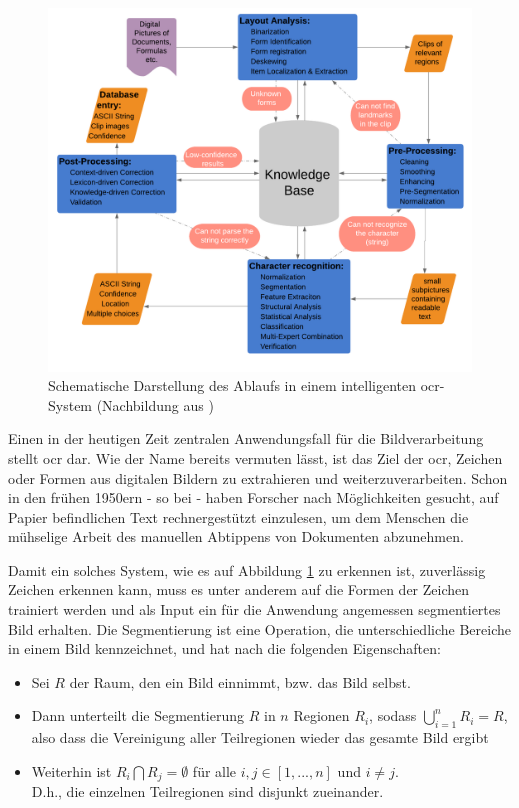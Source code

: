 	\begin{figure}[h]
		\centering
		\includegraphics[width=0.77\linewidth]{Ablauf-OCR_Cheriet-et-al.pdf}
		\caption[typisches \gls{ocr}-Ablaufschema]{Schematische Darstellung des 
			Ablaufs in einem intelligenten \gls{ocr}-System (Nachbildung aus 
			\cite[Seite 7]{cher-et-al-ocr})}
		\label{fig:ocr-system}
	\end{figure}
	
	
	Einen in der heutigen Zeit zentralen Anwendungsfall für die Bildverarbeitung stellt \gls{ocr} dar. Wie der Name bereits vermuten lässt, ist das Ziel der \gls{ocr}, Zeichen oder Formen aus digitalen Bildern zu extrahieren und weiterzuverarbeiten. Schon in den frühen 1950ern - so bei \cite{cher-et-al-ocr} - haben Forscher nach Möglichkeiten gesucht, auf Papier befindlichen Text rechnergestützt einzulesen, um dem Menschen die mühselige Arbeit des manuellen Abtippens von Dokumenten abzunehmen.
	
	

	Damit ein solches System, wie es auf Abbildung \ref{fig:ocr-system} zu 
	erkennen ist, zuverlässig Zeichen erkennen kann, muss es unter 
	anderem auf die Formen der Zeichen trainiert werden und als Input ein für 
	die Anwendung angemessen segmentiertes Bild erhalten. Die Segmentierung ist 
	eine Operation, die unterschiedliche Bereiche in einem Bild kennzeichnet, 
	und hat nach \cite[S. 690 f]{gonzalez-woods}
	die folgenden Eigenschaften:
	\begin{itemize}
		\item Sei $R$ der Raum, den ein Bild einnimmt, bzw. das Bild selbst.
		\item Dann unterteilt die Segmentierung $R$ in $n$ Regionen $R_{i}$, sodass $\bigcup\limits_{i=1}^{n} R_{i} = R$, also dass die Vereinigung aller Teilregionen wieder das gesamte Bild ergibt
		\item Weiterhin ist $R_{i} \bigcap R_{j} = \emptyset $ für alle $i, j \in [1, ... , n]$ und $i \neq j$. \\
		D.h., die einzelnen Teilregionen sind disjunkt zueinander.
	\end{itemize}
		